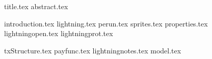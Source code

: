 \documentclass[11pt]{llncs}
\begin{document}
{title.tex}
\thispagestyle{plain}
{abstract.tex}

{introduction.tex}
{lightning.tex}
{perun.tex}
{sprites.tex}
{properties.tex}
{lightningopen.tex}
{lightningprot.tex}

{txStructure.tex}
{payfunc.tex}
{lightningnotes.tex}
{model.tex}

\end{document}
